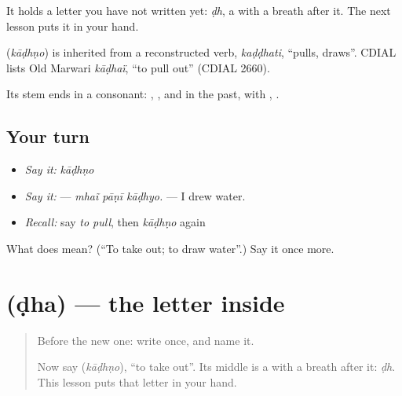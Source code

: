 It holds a letter you have not written yet: \emph{ḍh}, a \textbf{} with a breath after it. The next lesson puts it in your hand.

\begin{cousinweb}
\textbf{} (\emph{kāḍhṇo}) is inherited from a reconstructed verb, \emph{kaḍḍhati}, \textquotedblleft{}pulls, draws\textquotedblright{}. CDIAL lists Old Marwari \emph{kāḍhaï}, \textquotedblleft{}to pull out\textquotedblright{} (CDIAL 2660).
\end{cousinweb}

\begin{grammarlens}[title={What you've built}]
Its stem \textbf{} ends in a consonant: \textbf{ }, \textbf{ }, and in the past, with \textbf{}, \textbf{}.
\end{grammarlens}

\subsection*{Your turn}
\begin{itemize}
\raggedright
  \item \emph{Say it:} \emph{kāḍhṇo}
  \item \emph{Say it:} \textbf{  } — \emph{mhaĩ pāṇī kāḍhyo.} — I drew water.
  \item \emph{Recall:} say \emph{to pull}, then \emph{kāḍhṇo} again
\end{itemize}

\begin{tcolorbox}[breakable,colback=teal!4,colframe=teal!35!black,title={Before you move on}]
What does \textbf{} mean? (\textquotedblleft{}To take out; to draw water\textquotedblright{}.) Say it once more.
\end{tcolorbox}
\section[\texorpdfstring{\mw{ढ} (ḍha)}{ढ (ḍha)}]{ (ḍha) — the letter inside }

\label{lesson:MW-W49-ddha}



\begin{quote}
Before the new one: write \textbf{} once, and name it.

Now say \textbf{} (\emph{kāḍhṇo}), \textquotedblleft{}to take out\textquotedblright{}. Its middle is a \textbf{} with a breath after it: \emph{ḍh}. This lesson puts that letter in your hand.
\end{quote}

